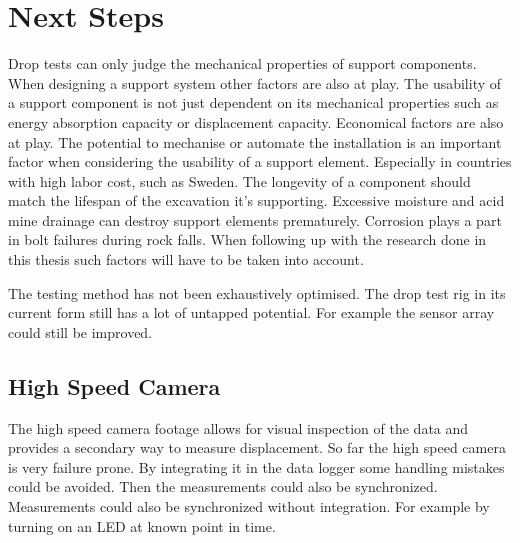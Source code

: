 \chapter{Next Steps}


Drop tests can only judge the mechanical properties of support components. When designing a support system other factors are also at play. The usability of a support component is not just dependent on its mechanical properties such as energy absorption capacity or displacement capacity. Economical factors are also at play.
The potential to mechanise or automate the installation is an important factor when considering the usability of a support element. Especially in countries with high labor cost, such as Sweden.
The longevity of a component should match the lifespan of the excavation it's supporting. Excessive moisture and acid mine drainage can destroy support elements prematurely. \autocite[2]{player04} \autocite[8]{Simser07} Corrosion plays a part in bolt failures during rock falls. \autocite[8]{villa13} When following up with the research done in this thesis such factors will have to be taken into account. 

The testing method has not been exhaustively optimised. The drop test rig in its current form still has a lot of untapped potential. For example the sensor array could still be improved.


\section{High Speed Camera}
The high speed camera footage allows for visual inspection of the data and provides a secondary way to measure displacement. %
So far the high speed camera is very failure prone. By integrating it in the data logger some handling mistakes could be avoided. Then the measurements could also be synchronized. 
Measurements could also be synchronized without integration. For example by turning on an LED at known point in time.

